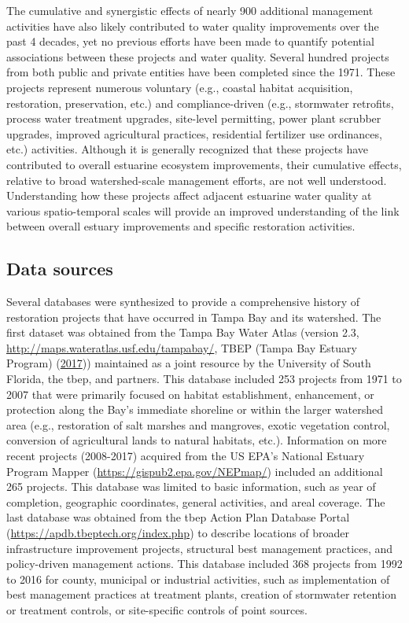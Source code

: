 \documentclass[]{article}
\begin{document}
The cumulative and synergistic effects of nearly 900 additional
management activities have also likely contributed to water quality
improvements over the past 4 decades, yet no previous efforts have been
made to quantify potential associations between these projects and water
quality. Several hundred projects from both public and private entities
have been completed since the 1971. These projects represent numerous
voluntary (e.g., coastal habitat acquisition, restoration, preservation,
etc.) and compliance-driven (e.g., stormwater retrofits, process water
treatment upgrades, site-level permitting, power plant scrubber
upgrades, improved agricultural practices, residential fertilizer use
ordinances, etc.) activities. Although it is generally recognized that
these projects have contributed to overall estuarine ecosystem
improvements, their cumulative effects, relative to broad
watershed-scale management efforts, are not well understood.
Understanding how these projects affect adjacent estuarine water quality
at various spatio-temporal scales will provide an improved understanding
of the link between overall estuary improvements and specific
restoration activities.

\hypertarget{data-sources}{%
\subsection{Data sources}\label{data-sources}}

Several databases were synthesized to provide a comprehensive history of
restoration projects that have occurred in Tampa Bay and its watershed.
The first dataset was obtained from the Tampa Bay Water Atlas (version
2.3, \url{http://maps.wateratlas.usf.edu/tampabay/}, TBEP (Tampa Bay
Estuary Program) (\protect\hyperlink{ref-TBEP17}{2017})) maintained as a
joint resource by the University of South Florida, the \ac{tbep}, and
partners. This database included 253 projects from 1971 to 2007 that
were primarily focused on habitat establishment, enhancement, or
protection along the Bay's immediate shoreline or within the larger
watershed area (e.g., restoration of salt marshes and mangroves, exotic
vegetation control, conversion of agricultural lands to natural
habitats, etc.). Information on more recent projects (2008-2017)
acquired from the US EPA's National Estuary Program Mapper
(\url{https://gispub2.epa.gov/NEPmap/}) included an additional 265
projects. This database was limited to basic information, such as year
of completion, geographic coordinates, general activities, and areal
coverage. The last database was obtained from the \ac{tbep} Action Plan
Database Portal (\url{https://apdb.tbeptech.org/index.php}) to describe
locations of broader infrastructure improvement projects, structural
best management practices, and policy-driven management actions. This
database included 368 projects from 1992 to 2016 for county, municipal
or industrial activities, such as implementation of best management
practices at treatment plants, creation of stormwater retention or
treatment controls, or site-specific controls of point sources.
\end{document}
